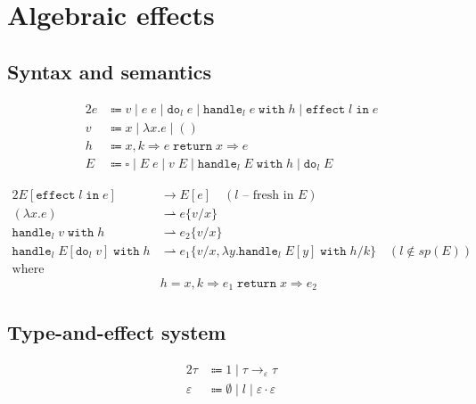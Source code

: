 \chapter{Algebraic effects}

\section{Syntax and semantics}

\newcommand\Do[2]{\texttt{do}_{#1}\;#2}
\newcommand\HandleWith[3]{\texttt{handle}_{#1}\;#2\;\texttt{with}\;#3}
\newcommand\Handler[5]{#1,#2\Rightarrow#3\;\texttt{return}\;#4\Rightarrow#5}
\newcommand\Effect[2]{\texttt{effect}\;#1\;\texttt{in}\;#2}

\begin{alignat*}{2}
  e & \Coloneqq v \mid e\;e \mid \Do{l}{e} \mid \HandleWith{l}{e}{h} \mid \Effect{l}{e} \\
  v & \Coloneqq x \mid \lambda x.e \mid () \\
  h & \Coloneqq \Handler{x}{k}{e}{x}{e} \\
  E & \Coloneqq \square \mid E\;e \mid v\;E \mid \HandleWith{l}{E}{h} \mid \Do{l}{E}
\end{alignat*}

\begin{alignat*}{2}
  E[\Effect{l}{e}] & \longrightarrow E[e] \quad (l \text{ -- fresh in } E) \\
  (\lambda x.e) & \rightharpoonup e\{v/x\} \\
  \HandleWith{l}{v}{h} & \rightharpoonup e_2\{v/x\} \\
  \HandleWith{l}{E[\Do{l}{v}]}{h} & \rightharpoonup e_1\{v/x, \lambda y.\HandleWith{l}{E[y]}{h}/k\} \quad (l \not\in sp(E)) \\
  \text{where } \\ & h = \Handler{x}{k}{e_1}{x}{e_2}
\end{alignat*}

\section{Type-and-effect system}

\begin{alignat*}{2}
  \tau & \Coloneqq 1 \mid \tau \to_\varepsilon \tau \\
  \varepsilon & \Coloneqq \emptyset \mid l \mid \varepsilon\cdot\varepsilon
\end{alignat*}

